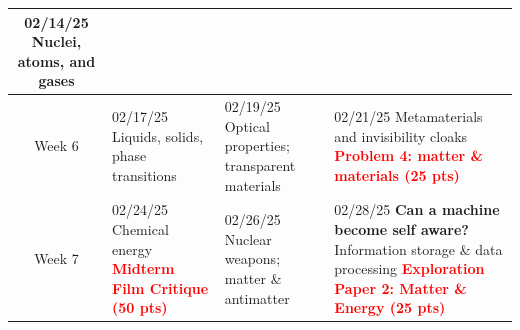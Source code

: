 \documentclass[11pt]{article}
\begin{document}
\begin{tabularx}{\textwidth}{|c|X|X|X|}
    02/14/25 \newline
    \newline
    Nuclei, atoms, and gases \\
    

    
    \hline
    Week 6 & 
    
    02/17/25 \newline
    \newline 
    Liquids, solids, phase transitions \newline
    \newline
    &
    
    02/19/25 \newline  
    \newline
    Optical properties; transparent materials \newline\newline 
    &

    02/21/25 \newline
    \newline
    Metamaterials and invisibility cloaks \newline\newline
    \textcolor{red}{\textbf{Problem 4: matter \& materials (25 pts)}} \\
    \hline
    
    Week 7 & 
    
    02/24/25 \newline
    \newline
    Chemical energy 
    \newline\newline
    \textcolor{red}{\textbf{Midterm Film Critique (50 pts)}}&
    
    02/26/25 \newline  
    \newline
    Nuclear weapons; matter \& antimatter
    \newline\newline   
    &

    02/28/25 \newline
    \textbf{Can a machine become self aware?}
    \newline
    Information storage \& data processing \newline\newline
    \textcolor{red}{\textbf{Exploration Paper 2: Matter \& Energy (25 pts)}} \\
    \hline
\end{tabularx}
 
\end{document}
